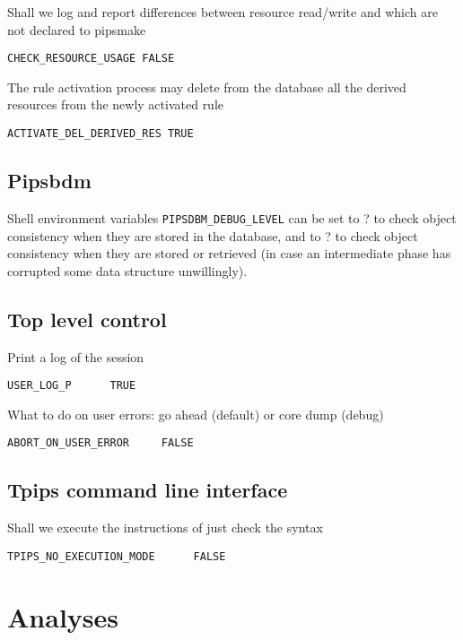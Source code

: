 Shall we log and report differences between resource read/write and
which are not declared to pipsmake

\begin{verbatim}
CHECK_RESOURCE_USAGE FALSE
\end{verbatim}

The rule activation process may delete from the database all the
derived resources from the newly activated rule

\begin{verbatim}
ACTIVATE_DEL_DERIVED_RES TRUE
\end{verbatim}

\subsection{Pipsbdm}

Shell environment variables \verb+PIPSDBM_DEBUG_LEVEL+ can be set to ?
to check object consistency when they are stored in the database, and to
? to check object consistency when they are stored or retrieved (in case
an intermediate phase has corrupted some data structure unwillingly).

\subsection{Top level control}

Print a log of the session

\begin{verbatim}
USER_LOG_P      TRUE
\end{verbatim}

What to do on user errors: go ahead (default) or core dump (debug)

\begin{verbatim}
ABORT_ON_USER_ERROR     FALSE
\end{verbatim}

\subsection{Tpips command line interface}

Shall we execute the instructions of just check the syntax

\begin{verbatim}
TPIPS_NO_EXECUTION_MODE      FALSE
\end{verbatim}

\section{Analyses}
\label{section-analyses}

